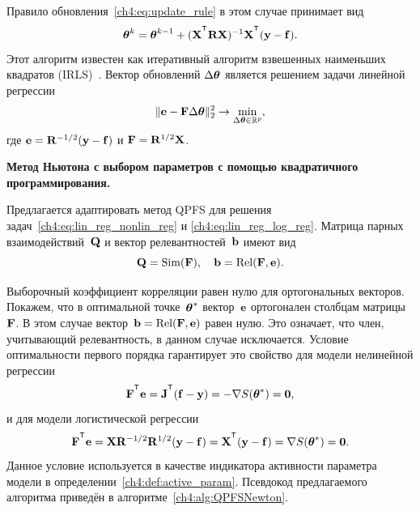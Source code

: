\documentclass[11pt, a5paper]{dissert}
\begin{document}
Правило обновления~\eqref{ch4:eq:update_rule} в этом случае принимает вид
\[
	\btheta^k = \btheta^{k - 1} + (\bX^{\T} \bR \bX)^{-1} \bX^{\T} (\by - \mathbf{f}).
\]
Этот алгоритм известен как итеративный алгоритм взвешенных наименьших квадратов (IRLS)~\cite{holland1977robust}. Вектор обновлений $\Delta \boldsymbol{\theta}$ является решением задачи линейной регрессии
\begin{equation}
	\| \mathbf{e} - \mathbf{F} \Delta \boldsymbol{\theta} \|_2^2 \rightarrow \min_{\Delta \boldsymbol{\theta} \in \mathbb{R}^{p}},
	\label{ch4:eq:lin_reg_log_reg}
\end{equation}
где $\mathbf{e} = \mathbf{R}^{-1/2} (\mathbf{y} - \mathbf{f})$ и $\mathbf{F} = \mathbf{R}^{1/2}\mathbf{X}$.

\textbf{Метод Ньютона с выбором параметров с помощью квадратичного программирования.}
\label{sec:ch4:newton_qpfs_algorithm}

Предлагается адаптировать метод QPFS для решения задач~\eqref{ch4:eq:lin_reg_nonlin_reg} и \eqref{ch4:eq:lin_reg_log_reg}. 
Матрица парных взаимодействий~$\mathbf{Q}$ и вектор релевантностей~$\mathbf{b}$ имеют вид
\[
	\mathbf{Q} = \text{Sim} (\mathbf{F}), \quad \mathbf{b} = \text{Rel} (\mathbf{F}, \mathbf{e}).
\]

Выборочный коэффициент корреляции равен нулю для ортогональных векторов.
Покажем, что в оптимальной точке~$\boldsymbol{\theta}^*$ вектор~$\mathbf{e}$ ортогонален столбцам матрицы~$\mathbf{F}$. 
В этом случае вектор~$\mathbf{b} = \text{Rel} (\mathbf{F}, \mathbf{e})$ равен нулю. Это означает, что член, учитывающий релевантность, в данном случае исключается.
Условие оптимальности первого порядка гарантирует это свойство для модели нелинейной регрессии
\[
	\bF^{\T} \be = \bJ^{\T} (\mathbf{f} - \by) = - \nabla S(\btheta^*) = \boldsymbol{0},
\]
и для модели логистической регрессии
\[
	\bF^{\T} \be = \bX \bR^{-1/2} \bR^{1/2} (\by - \mathbf{f}) = \bX^{\T} (\by - \mathbf{f}) = \nabla S(\btheta^*) = \boldsymbol{0}.
\]
Данное условие используется в качестве индикатора активности параметра модели в определении~\ref{ch4:def:active_param}.
Псевдокод предлагаемого алгоритма приведён в алгоритме~\ref{ch4:alg:QPFSNewton}.
\end{document}
